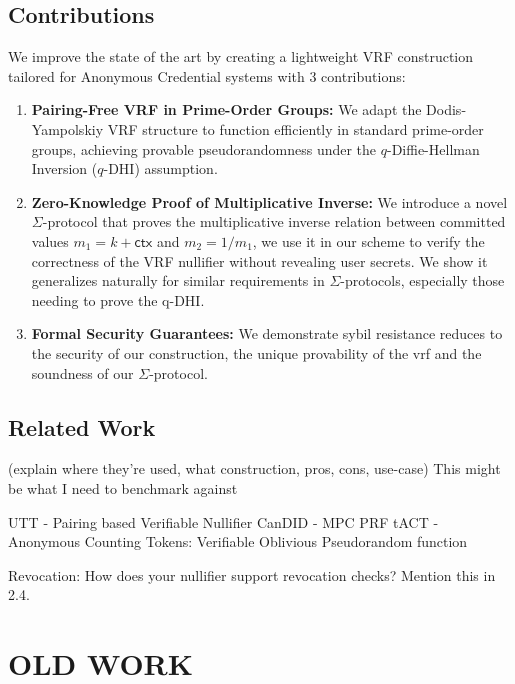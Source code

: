 \subsection{Contributions}

\noindent We improve the state of the art by creating a lightweight VRF construction tailored for Anonymous Credential systems with 3 contributions:
\begin{enumerate}
        \item \textbf{Pairing-Free VRF in Prime-Order Groups:} We adapt the Dodis-Yampolskiy VRF structure to function efficiently in standard prime-order groups, achieving provable pseudorandomness under the $q$-Diffie-Hellman Inversion ($q$-DHI) assumption.

        \item \textbf{Zero-Knowledge Proof of Multiplicative Inverse:} We introduce a novel $\Sigma$-protocol that proves the multiplicative inverse relation between committed values $m_1 = k + \textsf{ctx}$ and $m_2 = 1/m_1$, we use it in our scheme to verify the correctness of the VRF nullifier without revealing user secrets. We show it generalizes naturally for similar requirements in $\Sigma$-protocols, especially those needing to prove the q-DHI.

         \item \textbf{Formal Security Guarantees:} We demonstrate sybil resistance reduces to the security of our construction, the unique provability of the vrf and the soundness of our $\Sigma$-protocol.
\end{enumerate}


\subsection{Related Work}
(explain where they're used, what construction, pros, cons, use-case) This might be what I need to benchmark against

UTT - Pairing based Verifiable Nullifier
CanDID - MPC PRF
tACT - 
Anonymous Counting Tokens: Verifiable Oblivious Pseudorandom function






Revocation: How does your nullifier support revocation checks? Mention this in 2.4.

\newpage
\section{OLD WORK}







